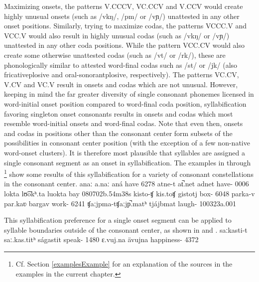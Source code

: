 Maximizing onsets, the patterns V.CCCV, VC.CCV and V.CCV would create highly unusual onsets (such as /vkŋ/, /pm/ or /vɲ/) unattested in any other onset positions. 
Similarly, trying to maximize codas, the patterns VCCC.V and VCC.V would also result in highly unusual codas (such as /vkŋ/ or /vɲ/) unattested in any other coda positions. 
While the pattern VCC.CV would also create some otherwise unattested codas (such as /vt/ or /rk/), these are phonologically similar to attested word-final codas such as /st/ or /jk/ (also fricative\PLUS plosive and oral-sonorant\PLUS plosive, respectively). 
The patterns VC.CV, V.CV and VC.V result in onsets and codas which are not unusual. However, keeping in mind the far greater diversity of single consonant phonemes licensed in word-initial onset position compared to word-final coda position, syllabification favoring singleton onset consonants results in onsets and codas which most resemble word-initial onsets and word-final codas. Note that even then, onsets and codas in positions other than the consonant center form subsets of the possibilities in consonant center position (with the exception of a few non-native word-onset clusters). It is therefore most plausible that syllables are assigned a single consonant segment as an onset in syllabification. The examples in  through \footnote{Cf. Section \ref{examplesExample} for an explanation of the sources in the examples in the current chapter.} 
show some results of this syllabification for a variety of consonant constellations in the consonant center.
	{anaː}	{a.naː}		{aná}	{have\BS{}}	{6278}
		{atne-t}	{at̚.net}		{adnet}	{have-}	{0006}
		{lokta}	{lʊ͡okʰ.ta}		{luokta}	{bay\BS{}}	{080702b}{.54m38s}
			{kisto-ʧ}	{kis.toʧ}		{gistotj}	{box-}		{6048}
	{parka-v}	{par.kaʋ}		{bargav}	{work-}	{6241}
		{ʧaːjpma-t}{ʧaːjp̚.matʰ}	{tjájbmat}	{laugh-}		{100323a}{.001}

This syllabification preference for a single onset segment can be applied to syllable boundaries outside of the consonant center, as shown in  and . 
		{saːkasti-t}	{saː.kas.titʰ}	{ságastit}	{speak-}			{1480}
	{ɛ.vuj.na}		{ävujna}	{happiness-}	{4372}

